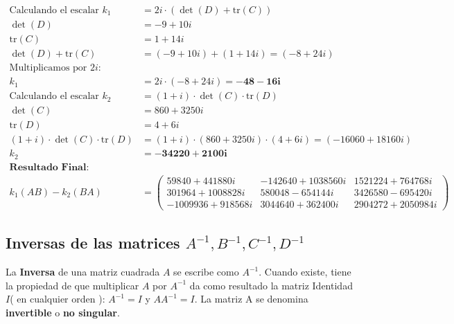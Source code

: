 \documentclass[11pt]{article}
\begin{document}
    $\displaystyle 
\begin{aligned}
\text{Calculando el escalar } k_1 &= 2i \cdot (\det(D) + \text{tr}(C)) \\[0.2em]
\det(D) &= -9 + 10i \\[0.2em]
\text{tr}(C) &= 1 + 14i \\[0.2em]
\det(D) + \text{tr}(C) &= (-9 + 10i) + (1 + 14i) = 
(-8 + 24i) \\[0.2em]
\text{Multiplicamos por } 2i: \\[0.2em]
k_1 &= 2i \cdot (-8 + 24i) = \mathbf{-48 - 16i} \\[1em]
\text{Calculando el escalar } k_2 &= (1 + i) \cdot \det(C) \cdot \text{tr}(D) \\[0.2em]
\det(C) &= 860 + 3250i \\[0.2em]
\text{tr}(D) &= 4 + 6i \\[0.2em]
(1 + i) \cdot \det(C) \cdot \text{tr}(D) &= (1 + i) \cdot (860 + 3250i) \cdot 
(4 + 6i) = (-16060 + 18160i) \\[0.2em]
k_2 &= \mathbf{-34220 + 2100i} \\[1em]
\mathbf{\text{Resultado Final:}} \\[0.2em]
k_1(AB) - k_2(BA) &= \begin{pmatrix} 59840 + 441880i & -142640 + 1038560i & 1521224 + 764768i \\ 301964 + 1008828i & 580048 - 654144i & 3426580 - 695420i \\ -1009936 + 918568i & 3044640 + 362400i & 2904272 + 2050984i \end{pmatrix}
\end{aligned}
$

    
    \subsection{\texorpdfstring{Inversas de las matrices
\(A^{-1}, B^{-1}, C^{-1}, D^{-1}\)}{Inversas de las matrices A\^{}\{-1\}, B\^{}\{-1\}, C\^{}\{-1\}, D\^{}\{-1\}}}\label{inversas-de-las-matrices-a-1-b-1-c-1-d-1}

La \textbf{Inversa} de una matriz cuadrada \(A\) se escribe como
\(A^{-1}\). Cuando existe, tiene la propiedad de que multiplicar \(A\)
por \(A^{-1}\) da como resultado la matriz Identidad \emph{\(I\)}( en
cualquier orden ): \(A^{-1} = I\) y \(AA^{-1} = I\). La matriz A se
denomina \textbf{invertible} o \textbf{no singular}.
\end{document}
